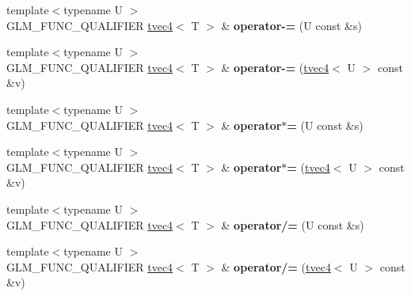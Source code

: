 \begin{DoxyCompactItemize}
\item 
\hypertarget{structglm_1_1detail_1_1tvec4_ae4f2e7aeeb141a09c40ec237b06640a2}{{\footnotesize template$<$typename U $>$ }\\G\-L\-M\-\_\-\-F\-U\-N\-C\-\_\-\-Q\-U\-A\-L\-I\-F\-I\-E\-R \hyperlink{structglm_1_1detail_1_1tvec4}{tvec4}$<$ T $>$ \& {\bfseries operator-\/=} (U const \&s)}\label{structglm_1_1detail_1_1tvec4_ae4f2e7aeeb141a09c40ec237b06640a2}

\item 
\hypertarget{structglm_1_1detail_1_1tvec4_a4b723d5af6f90b0cce671e3f197c015e}{{\footnotesize template$<$typename U $>$ }\\G\-L\-M\-\_\-\-F\-U\-N\-C\-\_\-\-Q\-U\-A\-L\-I\-F\-I\-E\-R \hyperlink{structglm_1_1detail_1_1tvec4}{tvec4}$<$ T $>$ \& {\bfseries operator-\/=} (\hyperlink{structglm_1_1detail_1_1tvec4}{tvec4}$<$ U $>$ const \&v)}\label{structglm_1_1detail_1_1tvec4_a4b723d5af6f90b0cce671e3f197c015e}

\item 
\hypertarget{structglm_1_1detail_1_1tvec4_aa77551306d13abb5b165984f98da45da}{{\footnotesize template$<$typename U $>$ }\\G\-L\-M\-\_\-\-F\-U\-N\-C\-\_\-\-Q\-U\-A\-L\-I\-F\-I\-E\-R \hyperlink{structglm_1_1detail_1_1tvec4}{tvec4}$<$ T $>$ \& {\bfseries operator$\ast$=} (U const \&s)}\label{structglm_1_1detail_1_1tvec4_aa77551306d13abb5b165984f98da45da}

\item 
\hypertarget{structglm_1_1detail_1_1tvec4_a669b40611304d82c6dbc8352cc4ea6a6}{{\footnotesize template$<$typename U $>$ }\\G\-L\-M\-\_\-\-F\-U\-N\-C\-\_\-\-Q\-U\-A\-L\-I\-F\-I\-E\-R \hyperlink{structglm_1_1detail_1_1tvec4}{tvec4}$<$ T $>$ \& {\bfseries operator$\ast$=} (\hyperlink{structglm_1_1detail_1_1tvec4}{tvec4}$<$ U $>$ const \&v)}\label{structglm_1_1detail_1_1tvec4_a669b40611304d82c6dbc8352cc4ea6a6}

\item 
\hypertarget{structglm_1_1detail_1_1tvec4_a212fbfca7e7df1471c42e92e2d69315a}{{\footnotesize template$<$typename U $>$ }\\G\-L\-M\-\_\-\-F\-U\-N\-C\-\_\-\-Q\-U\-A\-L\-I\-F\-I\-E\-R \hyperlink{structglm_1_1detail_1_1tvec4}{tvec4}$<$ T $>$ \& {\bfseries operator/=} (U const \&s)}\label{structglm_1_1detail_1_1tvec4_a212fbfca7e7df1471c42e92e2d69315a}

\item 
\hypertarget{structglm_1_1detail_1_1tvec4_abc19b0306f0709294ffbdec9583ec779}{{\footnotesize template$<$typename U $>$ }\\G\-L\-M\-\_\-\-F\-U\-N\-C\-\_\-\-Q\-U\-A\-L\-I\-F\-I\-E\-R \hyperlink{structglm_1_1detail_1_1tvec4}{tvec4}$<$ T $>$ \& {\bfseries operator/=} (\hyperlink{structglm_1_1detail_1_1tvec4}{tvec4}$<$ U $>$ const \&v)}\label{structglm_1_1detail_1_1tvec4_abc19b0306f0709294ffbdec9583ec779}


\end{DoxyCompactItemize}
